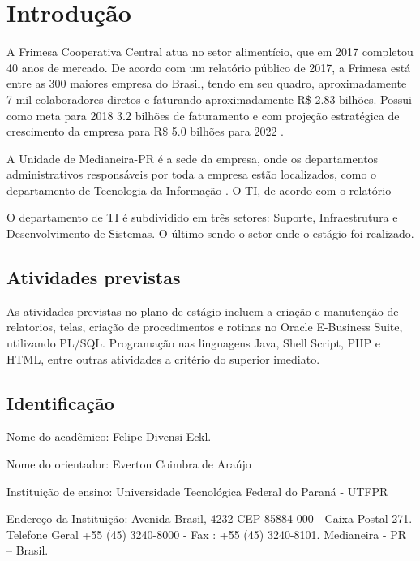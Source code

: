 \chapter{Introdução}\label{ch:intro}

A Frimesa Cooperativa Central atua no setor alimentício, que em 2017 completou 40 anos de mercado. De acordo com um relatório público de 2017, a Frimesa está entre as 300 maiores empresa do Brasil, tendo em seu quadro, aproximadamente 7 mil colaboradores diretos e faturando aproximadamente R\$ 2.83 bilhões. Possui como meta para 2018 3.2 bilhões de faturamento e com projeção estratégica de crescimento da empresa para R\$ 5.0 bilhões para 2022 \cite{relatorio2017}.


A Unidade de Medianeira-PR é a sede da empresa, onde os departamentos administrativos responsáveis por toda a empresa estão localizados, como o departamento de Tecnologia da Informação . O TI, de acordo com o relatório %

O departamento de TI é subdividido em três setores: Suporte, Infraestrutura e Desenvolvimento de Sistemas. O último sendo o setor onde o estágio foi realizado.

\section{Atividades previstas}

As atividades previstas no plano de estágio incluem a criação e manutenção de relatorios, telas, criação de procedimentos e rotinas no Oracle E-Business Suite, utilizando PL/SQL. Programação nas linguagens Java, Shell Script, PHP e HTML, entre outras atividades a critério do superior imediato.

\section{Identificação}

Nome do acadêmico: Felipe Divensi Eckl.

Nome do orientador: Everton Coimbra de Araújo

Instituição de ensino: Universidade Tecnológica Federal do Paraná - UTFPR

Endereço da Instituição: 
Avenida Brasil, 4232 CEP 85884-000 - Caixa Postal 271.
Telefone Geral +55 (45) 3240-8000 - Fax : +55 (45) 3240-8101.
Medianeira - PR – Brasil.


